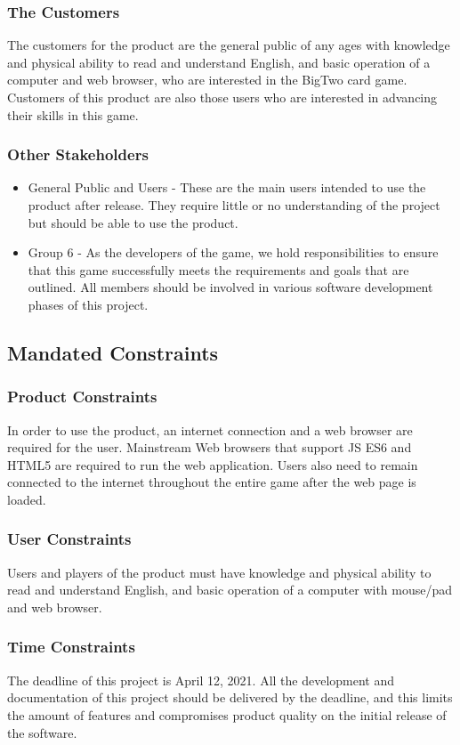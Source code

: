 \documentclass[12pt, titlepage]{article}
\begin{document}
\subsubsection{The Customers}
The customers for the product are the general public of any ages with knowledge and physical ability to read and understand English, and basic operation of a computer and web browser, who are interested in the BigTwo card game. Customers of this product are also those users who are interested in advancing their skills in this game.

\subsubsection{Other Stakeholders}
\begin{itemize}
    \item General Public and Users - These are the main users intended to use the product after release. They require little or no understanding of the project but should be able to use the product.
    \item Group 6 - As the developers of the game, we hold responsibilities to ensure that this game successfully meets the requirements and goals that are outlined. All members should be involved in various software development phases of this project.
\end{itemize}

\subsection{Mandated Constraints}
\subsubsection{Product Constraints}
In order to use the product, an internet connection and a web browser are required for the user. Mainstream Web browsers that support JS ES6 and HTML5 are required to run the web application. Users also need to remain connected to the internet throughout the entire game after the web page is loaded.
\subsubsection{User Constraints}
Users and players of the product must have knowledge and physical ability to read and understand English, and basic operation of a computer with mouse/pad and web browser.
\subsubsection{Time Constraints}
The deadline of this project is April 12, 2021. All the development and documentation of this project should be delivered by the deadline, and this limits the amount of features and compromises product quality on the initial release of the software.
\end{document}
